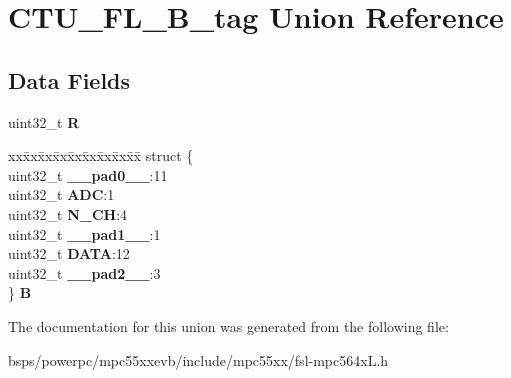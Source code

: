 \hypertarget{unionCTU__FL__32B__tag}{}\section{C\+T\+U\+\_\+\+F\+L\+\_\+B\+\_\+tag Union Reference}
\label{unionCTU__FL__32B__tag}
\subsection*{Data Fields}
\begin{DoxyCompactItemize}
\item 
\mbox{\label{unionCTU__FL__32B__tag_a332ef10cb2f4651c576868fe9eecfc2e}} 
uint32\+\_\+t {\bfseries R}
\item 
\mbox{\label{unionCTU__FL__32B__tag_a2b2e4028e7a58e6effcdd3ffc678db70}} 
\begin{tabbing}
xx\=xx\=xx\=xx\=xx\=xx\=xx\=xx\=xx\=\kill
struct \{\\
\>uint32\_t {\bfseries \_\_pad0\_\_}:11\\
\>uint32\_t {\bfseries ADC}:1\\
\>uint32\_t {\bfseries N\_CH}:4\\
\>uint32\_t {\bfseries \_\_pad1\_\_}:1\\
\>uint32\_t {\bfseries DATA}:12\\
\>uint32\_t {\bfseries \_\_pad2\_\_}:3\\
\} {\bfseries B}\\

\end{tabbing}\end{DoxyCompactItemize}


The documentation for this union was generated from the following file\+:\begin{DoxyCompactItemize}
\item 
bsps/powerpc/mpc55xxevb/include/mpc55xx/fsl-\/mpc564x\+L.\+h\end{DoxyCompactItemize}
